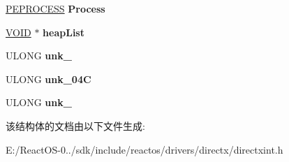 \begin{DoxyCompactItemize}
\hyperlink{struct___e_p_r_o_c_e_s_s}{P\+E\+P\+R\+O\+C\+E\+SS} {\bfseries Process}
\item 
\mbox{\label{struct___e_d_d___d_i_r_e_c_t_d_r_a_w___l_o_c_a_l_af9ce328e5b24f342b9885c967803241a}} 
\hyperlink{interfacevoid}{V\+O\+ID} $\ast$ {\bfseries heap\+List}
\item 
\mbox{\label{struct___e_d_d___d_i_r_e_c_t_d_r_a_w___l_o_c_a_l_a35a697d9bc1d0526758f5f110d2f7583}} 
U\+L\+O\+NG {\bfseries unk\+\_}
\item 
\mbox{\label{struct___e_d_d___d_i_r_e_c_t_d_r_a_w___l_o_c_a_l_af8e5e716ae9b1c1f4f4fbdede1c5b164}} 
U\+L\+O\+NG {\bfseries unk\+\_\+04C}
\item 
\mbox{\label{struct___e_d_d___d_i_r_e_c_t_d_r_a_w___l_o_c_a_l_a4ba09cf6e7bb88a8ab2da65a792e0150}} 
U\+L\+O\+NG {\bfseries unk\+\_}
\end{DoxyCompactItemize}


该结构体的文档由以下文件生成\+:\begin{DoxyCompactItemize}
\item 
E\+:/\+React\+O\+S-\/0../sdk/include/reactos/drivers/directx/directxint.\+h\end{DoxyCompactItemize}
